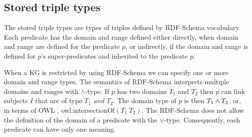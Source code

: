 \documentclass[runningheads]{llncs}
\newcommand{\memo}[1]{}
\begin{document}
\memo{The types of $s$ and $o$ can be any classes $T_s$ and $T_o$ from
  ${\cal I}_c$, while the type of $p$ has to be a class $T_p$ that is
  a subclass of rdf:Property. The typing of a triple $t$ is correct
  since the interpretation of $T$ includes $t$.}

\memo{Moreover, the types $T$ that are derived by the above rule are
  minimal in the sense that given the information provided, i.e., the
  types of $t$'s components, their interpretations are minimal
  possible comparing them to the interpretations of all other derived
  types of $t$.}






\subsection{Stored triple types\label{sec:stored-3types}}

The stored triple types are types of triples defined by RDF-Schema
\cite{rdfschema} vocabulary. Each predicate has the domain and range
defined either directly, when domain and range are defined for the
predicate $p$, or indirectly, if the domain and range is defined for
$p$'s super-predicates and inherited to the predicate $p$.

When a KG is restricted by using RDF-Schema we can specify one or more
domain and range types. The semantics of RDF-Schema
\cite{rdfsemantics} interprets multiple domains and ranges with
$\land$-type. If $p$ has two domains $T_1$ and $T_2$ then $p$ can link
subjects $I$ that are of type $T_1$ \emph{and} $T_2$. The domain type
of $p$ is then $T_1\land\/T_2$, or, in terms of OWL \cite{owl},
owl:intersectionOf$(T_1\ T_2)$. The RDF-Schema does not allow the
definition of the domain of a predicate with the
$\lor$-type. Consequently, each predicate can have only one meaning.
  
\memo{
However, we often need a semantics of a predicate that allows the
definition of a predicate with multiple senses, depending on the
context of the predicate. One reason for adding $\lor$-types to a KG
can be the expressive power of KG. These KGs use owl:unionOf and
owl:intersectionOf to define more complex types of predicates.
Examples of such KGs are schema.org, EPCIS, DBpedia (in few cases) and
model transformation tools. Further, KGs that can define contexts and
use contextual reasoning also use $\land$ and $\lor$-types. The
contexts are often defined by RDF named graphs, e.g., DBpedia
\cite{Auer2007} and Linked Data \cite{ld-site}. Examples of KGs that
can define and use contexts are Cyc \cite{cyc}, Scone
\cite{Fahlman2011} and RACER \cite{Haarslev2012}.}
\end{document}
